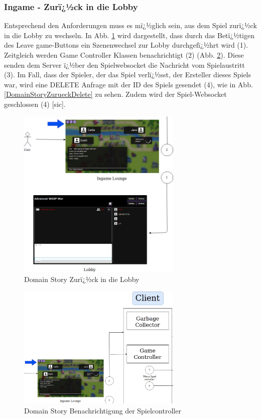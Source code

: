 \documentclass[12pt, titlepage]{scrartcl}
\begin{document}
		\subsubsection{Ingame - Zurï¿½ck in die Lobby}
		Entsprechend den Anforderungen muss es mï¿½glich sein, aus dem Spiel zurï¿½ck in die Lobby zu wechseln. In Abb. \ref{DomainStoryZurueckInDieLobby} wird dargestellt, dass durch das Betï¿½tigen des Leave game-Buttons ein Szenenwechsel zur Lobby durchgefï¿½hrt wird (1). Zeitgleich werden Game Controller Klassen benachrichtigt (2) (Abb. \ref{DomainStoryZurueckController}). Diese senden dem Server ï¿½ber den Spielwebsocket die Nachricht vom Spielaustritt (3). Im Fall, dass der Spieler, der das Spiel verlï¿½sst, der Ersteller dieses Spiels war, wird eine DELETE Anfrage mit der ID des Spiels gesendet (4), wie in Abb. \ref{DomainStoryZurueckDelete} zu sehen. Zudem wird der Spiel-Websocket geschlossen (4) [sic].
		\begin{figure}[H] 
			\centering
			\includegraphics[width=0.7\textwidth]{BackToLobby1.png}
			\caption{Domain Story Zurï¿½ck in die Lobby}
			\label{DomainStoryZurueckInDieLobby}
		\end{figure}
		\begin{figure}[H] 
			\centering
			\includegraphics[width=0.7\textwidth]{BackToLobby2.png}
			\caption{Domain Story Benachrichtigung der Spielcontroller}
			\label{DomainStoryZurueckController}
		\end{figure} 
\end{document}
